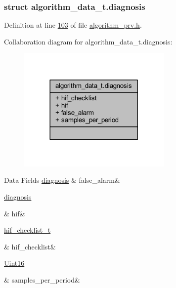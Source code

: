 \subsubsection{struct algorithm\+\_\+data\+\_\+t.\+diagnosis}


Definition at line \hyperlink{a00016_source_l00103}{103} of file \hyperlink{a00016_source}{algorithm\+\_\+prv.\+h}.



Collaboration diagram for algorithm\+\_\+data\+\_\+t.\+diagnosis\+:\nopagebreak
\begin{figure}[H]
\begin{center}
\leavevmode
\includegraphics[width=213pt]{d2/d21/a00895}
\end{center}
\end{figure}
\begin{DoxyFields}{Data Fields}
\hypertarget{a00016_a007fef3f860d7e7355bde3e5c57351bc}{\hyperlink{a00016_da/d74/a00099}{diagnosis}}\label{a00016_a007fef3f860d7e7355bde3e5c57351bc}
&
false\+\_\+alarm&
\\
\hline

\hypertarget{a00016_a5a512bc59bf67129d8b15701984e8bd3}{\hyperlink{a00016_d5/d1e/a00103}{diagnosis}}\label{a00016_a5a512bc59bf67129d8b15701984e8bd3}
&
hif&
\\
\hline

\hypertarget{a00016_a40c4e8e056e6e38e4450b3f88137abdb}{\hyperlink{a00021_d7/d9f/a00454}{hif\+\_\+checklist\+\_\+t}}\label{a00016_a40c4e8e056e6e38e4450b3f88137abdb}
&
hif\+\_\+checklist&
\\
\hline

\hypertarget{a00016_a74325e9c3b21529f768fbd60221ea39f}{\hyperlink{a00072_a59a9f6be4562c327cbfb4f7e8e18f08b}{Uint16}}\label{a00016_a74325e9c3b21529f768fbd60221ea39f}
&
samples\+\_\+per\+\_\+period&
\\
\hline

\end{DoxyFields}
\label{d5/d1e/a00103}
\hypertarget{a00016_d5/d1e/a00103}{}
